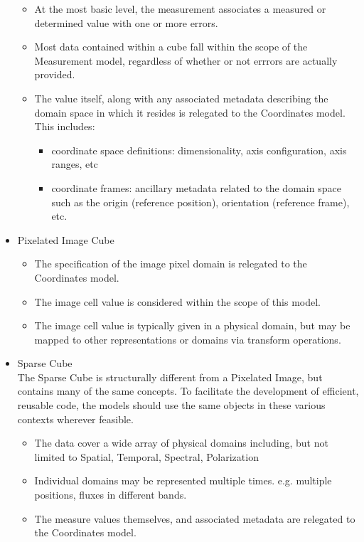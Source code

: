\documentclass[11pt,a4paper]{ivoa}
\begin{document}
\begin{itemize}
\begin{itemize}
      \item At the most basic level, the measurement associates a measured or determined value with one or more errors.
      \item Most data contained within a cube fall within the scope of the Measurement model, regardless of whether or not errrors are actually provided.
      \item The value itself, along with any associated metadata describing the domain space in which it resides is relegated to the Coordinates model.  This includes:
        \begin{itemize}
          \item coordinate space definitions: dimensionality, axis configuration, axis ranges, etc
          \item coordinate frames: ancillary metadata related to the domain space such as the origin (reference position), orientation (reference frame), etc.
        \end{itemize}
    \end{itemize}
    \item Pixelated Image Cube
    \begin{itemize}
      \item The specification of the image pixel domain is relegated to the Coordinates model.
      \item The image cell value is considered within the scope of this model.
      \item The image cell value is typically given in a physical domain, but may be mapped to other representations or domains via transform operations.
    \end{itemize}
    \item Sparse Cube \\
      The Sparse Cube is structurally different from a Pixelated Image, but contains many of the same concepts.
      To facilitate the development of efficient, reusable code, the models should use the same objects in
      these various contexts wherever feasible.
    \begin{itemize}
      \item The data cover a wide array of physical domains including, but not limited to Spatial, Temporal, Spectral, Polarization
      \item Individual domains may be represented multiple times. e.g. multiple positions, fluxes in different bands.
      \item The measure values themselves, and associated metadata are relegated to the Coordinates model.

\end{itemize}
\end{itemize}
\end{document}
